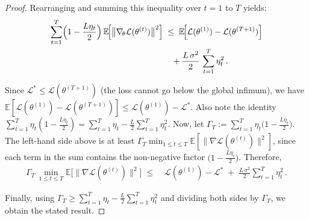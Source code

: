 \documentclass{article} %
\begin{document}
\begin{proof}
Rearranging and summing this inequality over $t=1$ to $T$ yields:
\begin{equation}
\begin{aligned}
\sum_{t=1}^T \Bigl(1 - \frac{L\eta_t}{2}\Bigr)\,\mathbb{E}\!\Bigl[\bigl\|\nabla_{\!\theta}\mathcal{L}(\theta^{(t)})\bigr\|^2\Bigr]
&\;\le\;
\mathbb{E}\!\Bigl[\mathcal{L}(\theta^{(1)}) - \mathcal{L}(\theta^{(T+1)})\Bigr] \\
&\quad + \frac{L\,\sigma^2}{2}\,\sum_{t=1}^T \eta_t^2\,.
\end{aligned}
\end{equation}


Since $\mathcal{L}^* \le \mathcal{L}(\theta^{(T+1)})$ (the loss cannot go below the global infimum), we have $\mathbb{E}[\mathcal{L}(\theta^{(1)}) - \mathcal{L}(\theta^{(T+1)})] \le \mathcal{L}(\theta^{(1)}) - \mathcal{L}^*$. Also note the identity $\sum_{t=1}^T \eta_t(1 - \frac{L\eta_t}{2}) = \sum_{t=1}^T \eta_t - \frac{L}{2}\sum_{t=1}^T \eta_t^2$. Now, let $\Gamma_T := \sum_{t=1}^T \eta_t\big(1 - \frac{L\eta_t}{2}\big)$. The left-hand side above is at least $\Gamma_T \min_{1\le t\le T}\mathbb{E}[\|\nabla \mathcal{L}(\theta^{(t)})\|^2]$, since each term in the sum contains the non-negative factor $\big(1 - \frac{L\eta_t}{2}\big)$. Therefore,
\begin{align}
\Gamma_T \,\min_{1 \le t \le T}\mathbb{E}\!\Big[\big\|\nabla \mathcal{L}(\theta^{(t)})\big\|^2\Big] \;\le\; &\mathcal{L}(\theta^{(1)}) - \mathcal{L}^* \;+\; \frac{L\,\sigma^2}{2}\sum_{t=1}^T \eta_t^2\,.
\end{align}

Finally, using $\Gamma_T \ge \sum_{t=1}^T \eta_t - \frac{L}{2}\sum_{t=1}^T \eta_t^2$ and dividing both sides by $\Gamma_T$, we obtain the stated result.
\end{proof}
\end{document}
